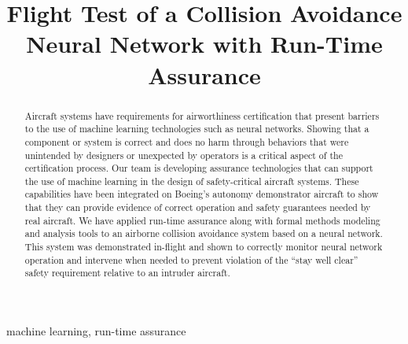 \documentclass[conference]{IEEEtran}
\begin{document}
\title{Flight Test of a Collision Avoidance Neural Network with Run-Time Assurance
}

\author{
\and
{}
\and
{}
}

\maketitle

\begin{abstract}
Aircraft systems have requirements for airworthiness certification that present barriers to the use of machine learning technologies such as neural networks. Showing that a component or system is correct and does no harm through behaviors that were unintended by designers or unexpected by operators is a critical aspect of the certification process.
Our team is developing assurance technologies that can support the use of machine learning in the design of safety-critical aircraft systems. These capabilities have been integrated on Boeing’s autonomy demonstrator aircraft to show that they can provide evidence of correct operation and safety guarantees needed by real aircraft.
We have applied run-time assurance along with formal methods modeling and analysis tools to an airborne collision avoidance system based on a neural network. This system was demonstrated in-flight and shown to correctly monitor neural network operation and intervene when needed to prevent violation of the “stay well clear” safety requirement relative to an intruder aircraft.
\end{abstract}

\begin{IEEEkeywords}
machine learning, run-time assurance
\end{IEEEkeywords}
\end{document}
